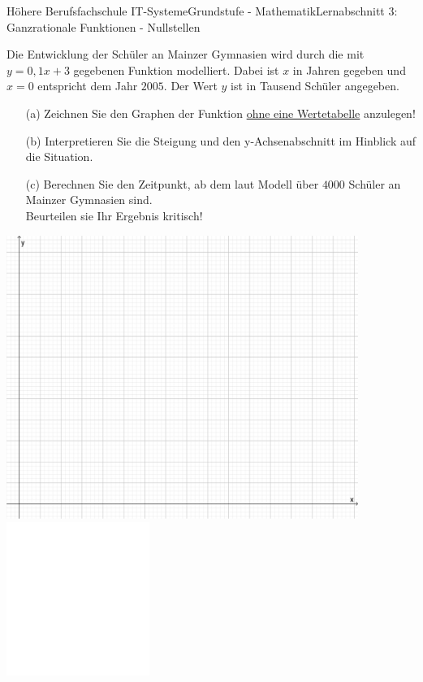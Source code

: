 \documentclass[oneside,openany,headings=optiontotoc,11pt,numbers=noenddot]{scrreprt}
\begin{document}
\begin{worksheet}{Höhere Berufsfachschule IT-Systeme}{Grundstufe - Mathematik}{Lernabschnitt 3: Ganzrationale Funktionen - Nullstellen}
\begin{framed}
		\end{framed}
		\normalsize
		\newpage
		\begin{framed}
			\noindent
			Die Entwicklung der Schüler an Mainzer Gymnasien wird durch die mit \(y=0,1x+3\) gegebenen Funktion modelliert. Dabei ist \(x\) in Jahren gegeben und \(x = 0\) entspricht dem Jahr \(2005\). Der Wert \(y\) ist in Tausend Schüler angegeben.
			\begin{itemize}
				\item[(a)] Zeichnen Sie den Graphen der Funktion \underline{ohne eine Wertetabelle} anzulegen!
				\item[(b)] Interpretieren Sie die Steigung und den y-Achsenabschnitt im Hinblick auf die Situation.
				\item[(c)] Berechnen Sie den Zeitpunkt, ab dem laut Modell über \(4000\) Schüler an Mainzer Gymnasien sind.\\
				Beurteilen sie Ihr Ergebnis kritisch!
			\end{itemize}
			\includegraphics[width=0.86\textwidth]{../99_Bilder/KoordLeer.png}\\
			\includegraphics[width=0.35\textwidth]{../../empty.jpg}
		\end{framed}
		\newpage
		

\end{worksheet}
\end{document}

